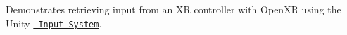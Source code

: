 Demonstrates retrieving input from an XR controller with Open\+XR using the Unity \href{https://docs.unity3d.com/Packages/com.unity.inputsystem@latest/}{\texttt{ Input System}}. ~\newline
 